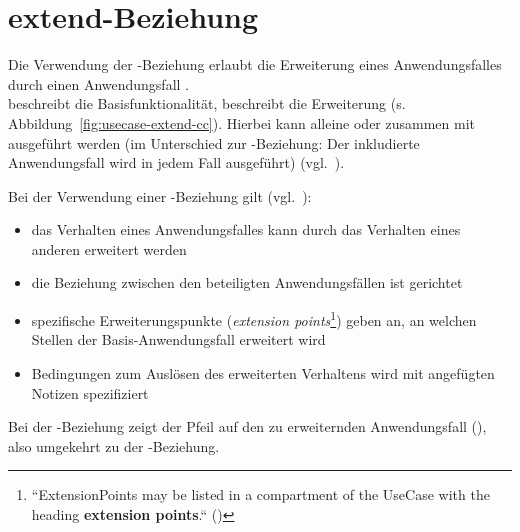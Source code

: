 \section{extend-Beziehung}

\begin{tcolorbox}[title=extend-Beziehung]
    Die Verwendung der -Beziehung erlaubt die Erweiterung eines Anwendungsfalles  durch einen Anwendungsfall .\\
     beschreibt die Basisfunktionalität,  beschreibt die Erweiterung (s. Abbildung~\ref{fig:usecase-extend-cc}).
    Hierbei kann  alleine oder zusammen mit  ausgeführt werden (im Unterschied zur -Beziehung: Der inkludierte Anwendungsfall wird in jedem Fall ausgeführt) (vgl.~\cite[54]{Bal05}).

    \noindent
    Bei der Verwendung einer -Beziehung gilt (vgl.~\cite[53]{Buh09}):

    \begin{itemize}
        \item das Verhalten eines Anwendungsfalles kann durch das Verhalten eines anderen erweitert werden
        \item die Beziehung zwischen den beteiligten Anwendungsfällen ist gerichtet
        \item spezifische Erweiterungspunkte (\textit{extension points}\footnote{
            ``ExtensionPoints may be listed in a compartment of the UseCase with the heading \textbf{extension points}.`` (\cite[642, Hervorhebung i.O.]{OMG17})
        }) geben an, an welchen Stellen der Basis-Anwendungsfall erweitert wird
        \item Bedingungen zum Auslösen des erweiterten Verhaltens wird mit angefügten Notizen spezifiziert
    \end{itemize}

    \noindent
    Bei der -Beziehung zeigt der Pfeil auf den zu erweiternden Anwendungsfall (\cite[218]{Oes05}), also umgekehrt zu der -Beziehung.

\end{tcolorbox}

